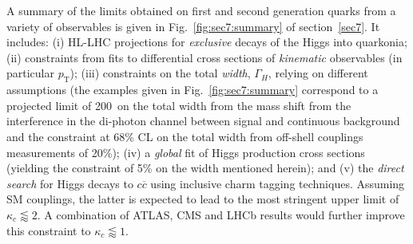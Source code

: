 \documentclass[../report.tex]{subfiles}
\begin{document}
A summary of the limits obtained on  first and second generation quarks from a variety of observables is given in Fig.~\ref{fig:sec7:summary} of section~\ref{sec7}. It includes: (i) HL-LHC projections for {\it exclusive} decays of the Higgs into quarkonia; (ii) constraints from fits to differential cross sections of {\it kinematic} observables (in particular $p_\mathrm{T}$); (iii) constraints on the total {\it width}, $\Gamma_H$, relying on different assumptions (the examples given in  Fig.~\ref{fig:sec7:summary} correspond to a projected limit of 200~\UMeV on the total width from the mass shift from the interference in the di-photon channel between signal and continuous background and the constraint at 68\% CL on the total width from off-shell couplings measurements of 20\%); (iv) a {\it global} fit of Higgs production cross sections (yielding the constraint of 5\% on the width mentioned herein); and (v) the {\it direct search} for Higgs decays to $c\overline{c}$ using inclusive charm tagging techniques. Assuming SM couplings, the latter is expected to lead to the most stringent upper limit of $\kappa_c \lessapprox 2$. A combination of ATLAS, CMS and LHCb results would further improve this constraint to $\kappa_c \lessapprox 1$.


\end{document}

